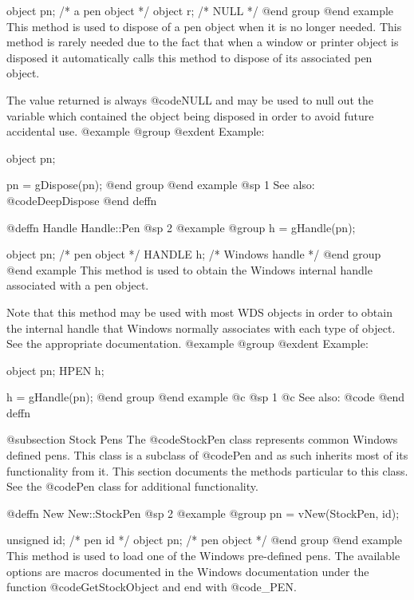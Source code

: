 object  pn;   /*  a pen object  */
object  r;    /*  NULL          */
@end group
@end example
This method is used to dispose of a pen object when it is no longer
needed.  This method is rarely needed due to the fact that when a window
or printer object is disposed it automatically calls this method to
dispose of its associated pen object.

The value returned is always @code{NULL} and may be used to null out
the variable which contained the object being disposed in order to
avoid future accidental use.
@example
@group
@exdent Example:

object  pn;

pn = gDispose(pn);
@end group
@end example
@sp 1
See also:  @code{DeepDispose}
@end deffn






@deffn {Handle} Handle::Pen
@sp 2
@example
@group
h = gHandle(pn);

object  pn;     /*  pen object    */
HANDLE  h;      /*  Windows handle  */
@end group
@end example
This method is used to obtain the Windows internal handle associated with
a pen object.  

Note that this method may be used with most WDS objects in order to obtain
the internal handle that Windows normally associates with each type of object.
See the appropriate documentation.
@example
@group
@exdent Example:

object  pn;
HPEN    h;

h = gHandle(pn);
@end group
@end example
@c @sp 1
@c See also:  @code{}
@end deffn









@subsection Stock Pens
The @code{StockPen} class represents common Windows defined pens.  This
class is a subclass of @code{Pen} and as such inherits most of its
functionality from it.  This section documents the methods particular to
this class.  See the @code{Pen} class for additional functionality.






@deffn {New} New::StockPen
@sp 2
@example
@group
pn = vNew(StockPen, id);

unsigned id;    /*  pen id      */
object  pn;     /*  pen object  */
@end group
@end example
This method is used to load one of the Windows pre-defined pens.
The available options are macros documented in the Windows documentation
under the function @code{GetStockObject} and end with @code{_PEN}.


